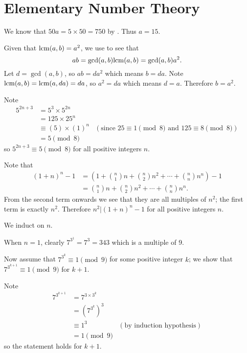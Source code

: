 \section{Elementary Number Theory}
\begin{questions}
    \item We know that $50a = 5 \times 50 = 750$ by . Thus $a = 15$.

    \item Given that $\mathrm{lcm}(a,b) = a^2$, we use  to see that
    \[
        ab = \gcd(a,b)\mathrm{lcm}(a,b) = \gcd(a,b)a^2.
    \]
    Let $d = \gcd(a,b)$, so $ab = da^2$ which means $b = da$. Note $\mathrm{lcm}(a,b) = \mathrm{lcm}(a, da) = da$, so $a^2 = da$ which means $d = a$. Therefore $b = a^2$.

    \item Note
    \begin{align*}
        5^{2n+3} &= 5^3 \times 5^{2n}\\
        &= 125 \times 25^n \\
        &\equiv (5) \times (1)^n & (\text{since } 25 \equiv 1 \pmod8 \text{ and } 125 \equiv 8 \pmod8)\\
        &= 5 \pmod8
    \end{align*}
    so $5^{2n+3} \equiv 5 \pmod8$ for all positive integers $n$.

    \item Note that
    \begin{align*}
        (1+n)^n - 1 &= \left(1 + {n \choose 1}n + {n \choose 2}n^2 + \cdots + {n \choose n}n^n\right) - 1\\
        &= {n \choose 1}n + {n \choose 2}n^2 + \cdots + {n \choose n}n^n.
    \end{align*}
    From the second term onwards we see that they are all multiples of $n^2$; the first term is exactly $n^2$. Therefore $n^2 \vert (1+n)^n - 1$ for all positive integers $n$.

    \item We induct on $n$.

    When $n = 1$, clearly $7^{3^1} = 7^3 = 343$ which is a multiple of 9.

    Now assume that $7^{3^k} \equiv 1 \pmod9$ for some positive integer $k$; we show that $7^{3^{k+1}} \equiv 1 \pmod9$ for $k + 1$.

    Note
    \begin{align*}
        7^{3^{k+1}} &= 7^{3\times3^k}\\
        &= \left(7^{3^k}\right)^3\\
        &\equiv 1^3 & (\text{by induction hypothesis})\\
        &= 1 \pmod9
    \end{align*}
    so the statement holds for $k+1$.


\end{questions}
